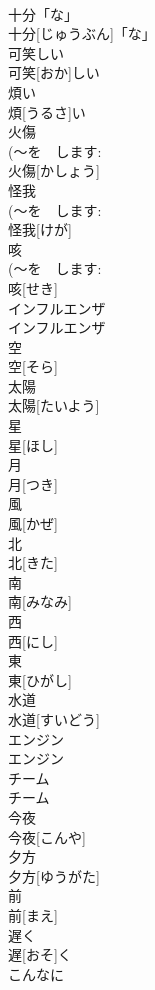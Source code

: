 \documentclass[8pt]{extreport}
\begin{document}
\begin{CJK}{UTF8}{min}
\\	十分「な」	
\\	十分[じゅうぶん]「な」	
\\	可笑しい	
\\	可笑[おか]しい	
\\	煩い	
\\	煩[うるさ]い	
\\	火傷	
\\	(〜を　します: 
\\	火傷[かしょう]	
\\	怪我	
\\	(〜を　します: 
\\	怪我[けが]	
\\	咳	
\\	(〜を　します: 
\\	咳[せき]	
\\	インフルエンザ	
\\	インフルエンザ	
\\	空	
\\	空[そら]	
\\	太陽	
\\	太陽[たいよう]	
\\	星	
\\	星[ほし]	
\\	月	
\\	月[つき]	
\\	風	
\\	風[かぜ]	
\\	北	
\\	北[きた]	
\\	南	
\\	南[みなみ]	
\\	西	
\\	西[にし]	
\\	東	
\\	東[ひがし]	
\\	水道	
\\	水道[すいどう]	
\\	エンジン	
\\	エンジン	
\\	チーム	
\\	チーム	
\\	今夜	
\\	今夜[こんや]	
\\	夕方	
\\	夕方[ゆうがた]	
\\	前	
\\	前[まえ]	
\\	遅く	
\\	遅[おそ]く	
\\	こんなに	

\end{CJK}
\end{document}
